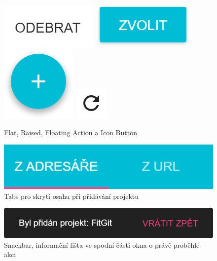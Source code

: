 \begin{figure}[ht]
	\mbox{\includegraphics[scale=0.5]{sections/ui/images/Button-Flat.png}}   
	\hspace{12px}
	\mbox{\includegraphics[scale=0.5]{sections/ui/images/Button-Raised.png}}
	\hspace{12px}
	\mbox{\includegraphics[scale=0.5]{sections/ui/images/Button-Floating.png}}
	\hspace{12px}
	\mbox{\includegraphics[scale=0.5]{sections/ui/images/Button-Icon.png}}
	\caption[Button]{Flat, Raised, Floating Action a Icon Button}
	\label{fig:buttons}
\end{figure}

\begin{figure}[ht]
\centering
\includegraphics[scale=0.5]{sections/ui/images/Tabs.png}
\caption[Tabs]{Tabs pro skrytí osahu při přidávání projektu}
\label{fig:tabs}
\end{figure}

\begin{figure}[ht]
\centering
\includegraphics[scale=0.5]{sections/ui/images/Snackbar.png}
\caption[Snackbar]{Snackbar, informační lišta ve spodní části okna o právě proběhlé akci}
\label{fig:snackbar}
\end{figure}

